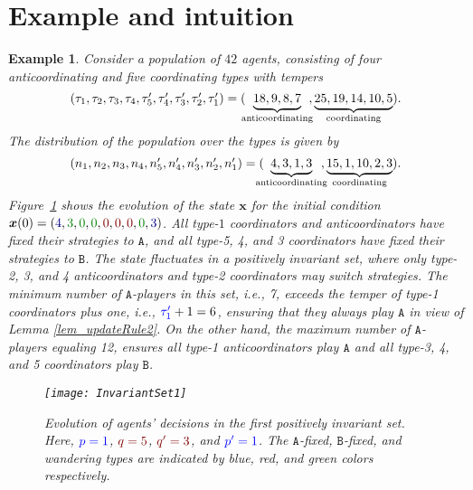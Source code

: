 \documentclass[10 pt,twocolumn,journal]{IEEEtran}
\theoremstyle{plain}
\newtheorem{example}{Example}[] %
\newcommand{\A}{\mathcal{A}}
\newcommand{\x}{\bm{x}}
\newcommand{\p}{\tb{p}}
\newcommand{\pp}{\tb{p'}}
\newcommand{\q}{\tr{q}}
\newcommand{\qq}{\tr{q'}}
\renewcommand{\A}{\mathtt{A}}
\newcommand{\B}{\mathtt{B}}
\newcommand{\tb}{\textcolor{blue}}
\newcommand{\tr}{\textcolor{Myred}}
\newcommand{\tg}{\textcolor{Mygreen}}
\theoremstyle{definition}
\begin{document}
\section{Example and intuition}   \label{sec:example}
\begin{example}     \label{example1}
    Consider a population of $42$ agents, consisting of four anticoordinating and five coordinating types with tempers
    \begin{equation*}
        \scalebox{.99}{\text{$
        (\tau_1,\tau_2,\tau_3,\tau_4,
        \tau'_5,\tau'_4,\tau'_3,\tau'_2,\tau'_1) = 
        (\!\!\underbrace{18,9,8,7}_{\text{anticoordinating}}\!\!,
     \underbrace{25,19,14,10,5}_{\text{coordinating}}).
     $}}
    \end{equation*}
    The distribution of the population over the types is given by
	\begin{equation*}
	 \scalebox{.99}{\text{$
	 (n_1,n_2,n_3,n_4,
        n'_5,n'_4,n'_3,n'_2,n'_1) = 
        (\!\!\!\!\underbrace{4,3,1,3}_{\text{anticoordinating}}\!\!\!, 
     \underbrace{15,1,10,2,3}_{\text{coordinating}}).
     $}}
    \end{equation*}
     Figure~\ref{fig:InvariantSet1} shows the evolution of the state $\x$ for the initial condition $\x(0)=({\color{Myblue}4}, {\color{Mygreen}3}, {\color{Mygreen}0}, {\color{Mygreen}0}, {\color{Myred}0}, {\color{Myred}0}, {\color{Myred}0}, {\color{Mygreen}0}, {\color{Myblue}3})$.  
     All type-$1$ coordinators and anticoordinators have fixed their strategies to $\A$, and all type-5, 4, and 3 coordinators have fixed their strategies to $\B$. 
     The state fluctuates in a positively invariant set, where only type-2, 3, and 4 anticoordinators and type-2 coordinators may switch strategies. 
     The minimum number of $\A$-players in this set, i.e., 7, exceeds the temper of type-1 coordinators plus one, i.e., $\tb{\tau'_1} + 1 = 6$, ensuring that they always play $\A$ in view of Lemma \ref{lem_updateRule2}.
     On the other hand, the maximum number of $\A$-players equaling 12, ensures all type-1 anticoordinators play $\A$ and all type-3, 4, and 5 coordinators play $\B$. 
     \begin{figure}[ht]
		\centering	\texttt{[image: InvariantSet1]}
        \caption{Evolution of agents' decisions in the first positively invariant set.
        Here, $\tb{\p=1}$, $\tr{\q=5}$, $\tr{\qq=3}$, and $\tb{\pp=1}$.
        The $\A$-fixed, $\B$-fixed, and wandering types are indicated by blue, red, and green colors respectively.}
		\label{fig:InvariantSet1}
	\end{figure} 
     

\end{example}
\end{document}
